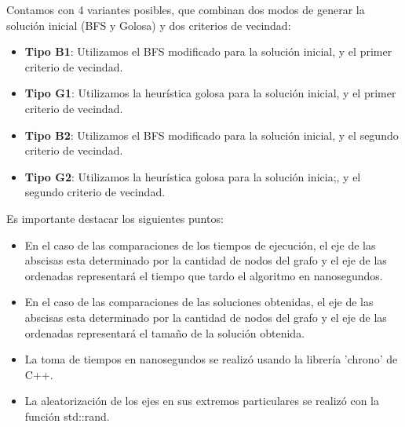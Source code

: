 Contamos con 4 variantes posibles, que combinan dos modos de generar la solución inicial (BFS y Golosa) y dos criterios de vecindad:

\begin{itemize}
	\item \textbf{Tipo B1}: Utilizamos el BFS modificado para la solución inicial, y el primer criterio de vecindad.
    \item \textbf{Tipo G1}: Utilizamos la heurística golosa para la solución inicial, y el primer criterio de vecindad.
    \item \textbf{Tipo B2}: Utilizamos el BFS modificado para la solución inicial, y el segundo criterio de vecindad.
    \item \textbf{Tipo G2}: Utilizamos la heurística golosa para la solución inicia;, y el segundo criterio de vecindad.
\end{itemize}

Es importante destacar los siguientes puntos:

\begin{itemize}
	\item En el caso de las comparaciones de los tiempos de ejecución, el eje de las abscisas esta determinado por la cantidad de nodos del grafo y el eje de las ordenadas representará el tiempo que tardo el algoritmo en nanosegundos.
	\item En el caso de las comparaciones de las soluciones obtenidas, el eje de las abscisas esta determinado por la cantidad de nodos del grafo y el eje de las ordenadas representará el tamaño de la solución obtenida.
	\item La toma de tiempos en nanosegundos se realizó usando la librería 'chrono' de C++.
	\item La aleatorización de los ejes en sus extremos particulares se realizó con la función std::rand.
\end{itemize}

